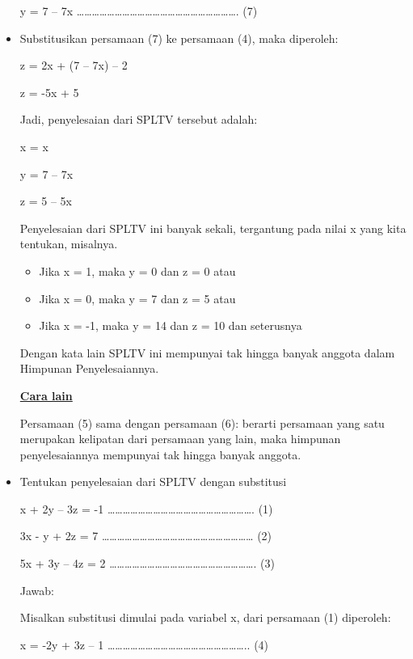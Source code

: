 \documentclass[11pt,fleqn]{book} %
\begin{document}
\begin{myEnumerate}
\begin{itemize}
		y = 7 – 7x ………………………………………………………. (7) \par
		\noindent 
		\item Substitusikan persamaan (7) ke persamaan (4), maka diperoleh: \par
		z = 2x + (7 – 7x) – 2 \par
		z = -5x + 5 \par
		Jadi, penyelesaian dari SPLTV tersebut adalah: \par
		x = x \par
		y = 7 – 7x \par
		z = 5 – 5x \par
		\noindent 
		Penyelesaian dari SPLTV ini banyak sekali, tergantung pada nilai x yang kita tentukan, misalnya. \par
		\noindent 
		\begin{itemize}
			\item Jika x = 1, maka y = 0 dan z = 0 atau \par
			\noindent 
			\item Jika x = 0, maka y = 7 dan z = 5 atau \par
			\noindent 
			\item Jika x = -1, maka y = 14 dan z = 10 dan seterusnya\end{itemize}
		\par
		\noindent 
		Dengan kata lain SPLTV ini mempunyai tak hingga banyak anggota dalam Himpunan Penyelesaiannya. \par
		\noindent 
		\textbf{\underline{Cara lain}} \par
		\noindent 
		Persamaan (5) sama dengan persamaan (6): berarti persamaan yang satu merupakan kelipatan dari persamaan yang lain, maka himpunan penyelesaiannya mempunyai tak hingga banyak anggota. \par
		\noindent 
		\item Tentukan penyelesaian dari SPLTV dengan substitusi \par
		\noindent 
		x + 2y – 3z = -1 …………………………………………………. (1) \par
		\noindent 
		3x - y + 2z = 7 …………………………………………………… (2) \par
		\noindent 
		5x + 3y – 4z = 2 …………………………………………………. (3) \par
		\noindent 
		Jawab: \par
		\noindent 
		Misalkan substitusi dimulai pada variabel x, dari persamaan (1) diperoleh: \par
		\noindent 
		x = -2y + 3z – 1 ……………………………………………….. (4) \par

\end{itemize}
\end{myEnumerate}
\end{document}
